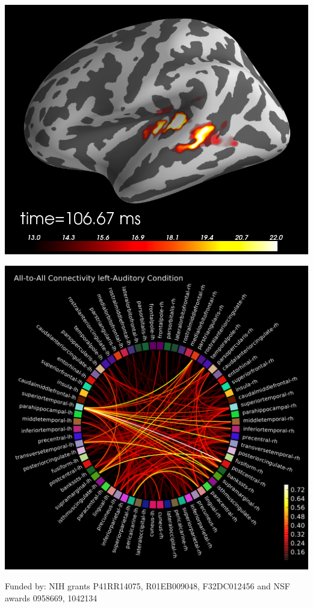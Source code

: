 \documentclass[t,11pt,compress]{beamer} %
\begin{document}
\begin{frame}[plain,t,c]
\begin{minipage}{1.09\linewidth}
\begin{minipage}{.23\linewidth}
\end{minipage}%
\hspace{2.5em}%
\begin{minipage}{.21\linewidth}
    \includegraphics[width=\linewidth]{pysurfer.png}%
\end{minipage}%
\hspace{2em}%
\begin{minipage}{.20\linewidth}
    \includegraphics[width=0.87\linewidth]{functional_connectivity.pdf}%
\end{minipage}
\vspace{1em}%
\end{minipage}
\begin{minipage}{\linewidth}
    \center
    Funded by: NIH grants P41RR14075, R01EB009048, F32DC012456 and NSF awards 0958669, 1042134
\end{minipage}
\smallskip
~
\end{frame}
\end{document}
